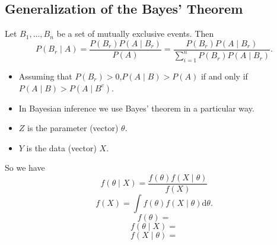 \documentclass[lecture,12pt,]{pcms-l}
\numberwithin{section}{chapter}
\numberwithin{equation}{chapter}
\theoremstyle{plain}
\theoremstyle{definition}
\theoremstyle{definition}
\begin{document}
\subsection{Generalization of the Bayes' Theorem}
Let $B_1,...,B_n$ be a set of mutually exclusive events. Then
\begin{equation}
P(B_r\mid A)=\frac{P(B_r)P(A\mid B_r)}{P(A)}=\frac{P(B_r)P(A\mid B_r)}{\sum_{i=1}^n P(B_r)P(A\mid B_r)}.
\end{equation}
\begin{itemize}
\item Assuming that $P(B_r)>0$,$P(A\mid B)>P(A)$ if and only if $P(A\mid B)>P(A\mid B^c)$.
\item In Bayesian inference we use Bayes' theorem in a particular way.
\item $Z$ is the parameter (vector) $\theta$.
\item $Y$ is the data (vector) $X$.
\end{itemize}
So we have 
\begin{equation}
f(\theta\mid X)=\frac{f(\theta)f(X\mid \theta)}{f(X)}
\end{equation}
\begin{equation}
f(X)=\int f(\theta)f(X\mid \theta)\mathrm{d}\theta.
\end{equation}
\begin{equation}
f(\theta)=
\end{equation}
\begin{equation}
f(\theta\mid X)=
\end{equation}
\begin{equation}
f(X\mid \theta)=
\end{equation}
\end{document}
